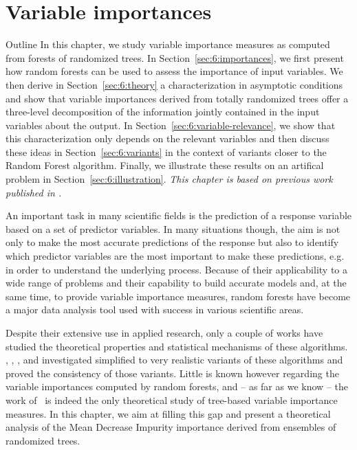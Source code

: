 \chapter{Variable importances}\label{ch:importances}

\begin{remark}{Outline}
In this chapter, we study variable importance measures as computed from forests of
randomized trees. In Section~\ref{sec:6:importances}, we first present how
random forests can be used to assess the importance of input variables.  We
then derive in Section~\ref{sec:6:theory} a characterization in asymptotic
conditions and show that variable importances derived from totally randomized trees
offer a three-level decomposition of the information jointly  contained in the
input variables about the output. In Section~\ref{sec:6:variable-relevance}, we
show that this  characterization only depends on the relevant variables and
then discuss these ideas in Section~\ref{sec:6:variants} in the context of
variants closer to the Random Forest algorithm. Finally, we illustrate these
results on an artifical problem in Section~\ref{sec:6:illustration}.
\textit{This chapter is based on previous work published in \citep{louppe:2013}.}
\end{remark}

An important task in many scientific fields is the prediction of  a response
variable based on a set of predictor variables. In many situations though, the
aim is not only to make the most accurate predictions of the response but also
to identify which predictor variables are the most important to make these
predictions, e.g. in order to understand the underlying process. Because of
their applicability to a wide range of problems and their capability to
build accurate models and, at the same time, to provide variable importance
measures, random forests have become a major data analysis tool used with
success in various scientific areas.

Despite their extensive use in applied research, only a couple of works have
studied the theoretical properties and statistical mechanisms of these
algorithms. \citet{zhao:2000}, \citet{breiman:2004},
\citet{biau:2008,biau:2012}, \citet{meinshausen:2006} and \citet{lin:2006}
investigated simplified to very realistic variants of these algorithms and
proved  the consistency of those variants. Little is known however regarding
the variable importances computed by random forests, and -- as far as we know
-- the work of~\citet{ishwaran:2007} is indeed the only theoretical study of
tree-based variable importance measures. In this chapter, we aim at filling
this gap and present a theoretical  analysis of the Mean Decrease Impurity
importance derived from ensembles of randomized trees.



